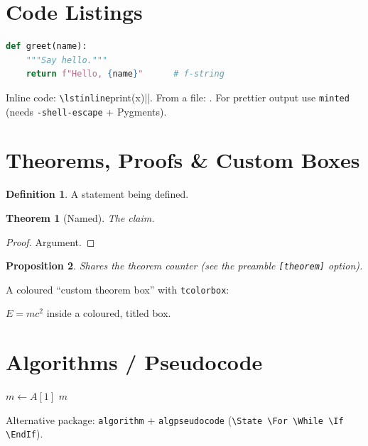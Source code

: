 \documentclass[11pt]{article}
\theoremstyle{plain}
\newtheorem{theorem}{Theorem}[section]
\newtheorem{proposition}[theorem]{Proposition}
\theoremstyle{definition}
\newtheorem{definition}{Definition}[section]
\theoremstyle{remark}
\begin{document}
\section{Code Listings}
\begin{lstlisting}[style=code, language=Python, caption={Demo}, label={lst:demo}]
def greet(name):
    """Say hello."""
    return f"Hello, {name}"      # f-string
\end{lstlisting}
Inline code: \verb|\lstinline|print(x)||. From a file:
\verb||. For prettier output use
\texttt{minted} (needs \verb|-shell-escape| + Pygments).

\section{Theorems, Proofs \& Custom Boxes}
\begin{definition}
A statement being defined.
\end{definition}
\begin{theorem}[Named]\label{thm:x}
The claim.
\end{theorem}
\begin{proof}
Argument. \qedhere
\end{proof}
\begin{proposition}
Shares the theorem counter (see the preamble \verb|[theorem]| option).
\end{proposition}
A coloured ``custom theorem box'' with \texttt{tcolorbox}:
\begin{keybox}
$E = mc^2$ inside a coloured, titled box.
\end{keybox}

\section{Algorithms / Pseudocode}
\begin{algorithm}[H]
\SetAlgoLined
{}
$m \gets A[1]$\;
\Return $m$\;
\caption{Find maximum (algorithm2e)}
\end{algorithm}
Alternative package: \texttt{algorithm} + \texttt{algpseudocode}
(\verb|\State \For \While \If \EndIf|).
\end{document}
